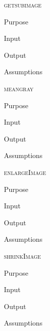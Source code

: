 \documentclass[pdftex, 11pt]{article}
\begin{document}
\begin{description}
\begin{description}
		\end{description}


	\item{\textsc{getsubimage}}
		\begin{description}
			\item{Purpose}


			\item{Input}


			\item{Output}


			\item{Assumptions}


		\end{description}


	\item{\textsc{meangray}}
		\begin{description}
			\item{Purpose}


			\item{Input}


			\item{Output}


			\item{Assumptions}


		\end{description}


	\item{\textsc{enlargeImage}}
		\begin{description}
			\item{Purpose}


			\item{Input}


			\item{Output}


			\item{Assumptions}


		\end{description}


	\item{\textsc{shrinkImage}}
		\begin{description}
			\item{Purpose}


			\item{Input}


			\item{Output}


			\item{Assumptions}


		\end{description}



\end{description}
\end{document}
